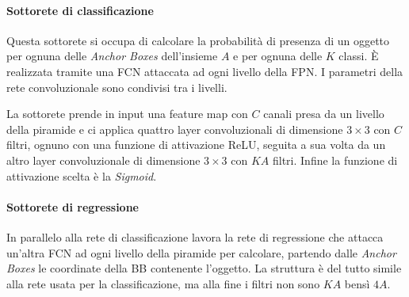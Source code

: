 \paragraph{Sottorete di classificazione}
Questa sottorete si occupa di calcolare la probabilità di presenza di un oggetto per ognuna delle \textit{Anchor Boxes} dell'insieme $A$ e per ognuna delle $K$ classi. È realizzata tramite una \ac{FCN} attaccata ad ogni livello della \ac{FPN}. I parametri della rete convoluzionale sono condivisi tra i livelli. 

La sottorete prende in input una feature map con $C$ canali presa da un livello della piramide e ci applica quattro layer convoluzionali di dimensione $3 \times 3$ con $C$ filtri, ognuno con una funzione di attivazione ReLU, seguita a sua volta da un altro layer convoluzionale di dimensione $3 \times 3$ con $KA$ filtri. 
Infine la funzione di attivazione scelta è la \textit{Sigmoid}.
\paragraph{Sottorete di regressione}
In parallelo alla rete di classificazione lavora la rete di regressione che attacca un'altra \ac{FCN} ad ogni livello della piramide per calcolare, partendo dalle \textit{Anchor Boxes} le coordinate della \ac{BB} contenente l'oggetto. La struttura è del tutto simile alla rete usata per la classificazione, ma alla fine i filtri non sono $KA$ bensì $4A$. 



